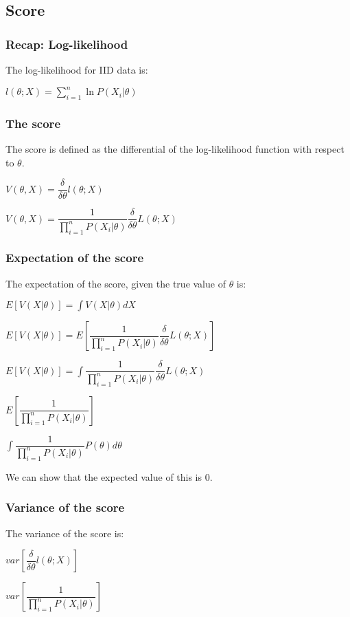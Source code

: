 
\subsection{Score}

\subsubsection{Recap: Log-likelihood}

The log-likelihood for IID data is:

\(l(\theta ; X)=\sum_{i=1}^n \ln P(X_i|\theta )\)

\subsubsection{The score}

The score is defined as the differential of the log-likelihood function with respect to \(\theta \).

\(V(\theta, X)=\dfrac{\delta }{\delta \theta }l(\theta ; X) \)

\(V(\theta, X)=\dfrac{1 }{\prod_{i=1}^nP(X_i|\theta )}\dfrac{\delta }{\delta \theta}L(\theta; X) \)

\subsubsection{Expectation of the score}

The expectation of the score, given the true value of \(\theta \) is:

\(E[V(X|\theta)]=\int V(X|\theta) dX\)

\(E[V(X|\theta)]=E[\dfrac{1 }{\prod_{i=1}^nP(X_i|\theta )}\dfrac{\delta }{\delta \theta}L(\theta; X) ]\)

\(E[V(X|\theta)]=\int \dfrac{1 }{\prod_{i=1}^nP(X_i|\theta )}\dfrac{\delta }{\delta \theta}L(\theta; X) \)

\(E[\dfrac{1 }{\prod_{i=1}^nP(X_i|\theta )}]\)

\(\int \dfrac{1 }{\prod_{i=1}^nP(X_i|\theta )}P(\theta )d\theta \)

We can show that the expected value of this is \(0\).

\subsubsection{Variance of the score}

The variance of the score is:

\(var [\dfrac{\delta }{\delta \theta }l(\theta ; X) ]\)

\(var [\dfrac{1 }{\prod_{i=1}^nP(X_i|\theta )}]\)


